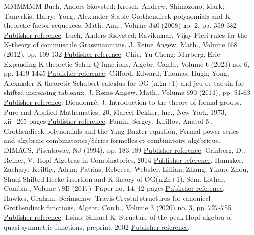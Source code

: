 \begin{thebibliography}{MMMMMM}
 Buch, Anders Skovsted; Kresch, Andrew; Shimozono, Mark; Tamvakis, Harry; Yong, Alexander Stable Grothendieck polynomials and K-theoretic factor sequences, Math. Ann., Volume 340 (2008) no. 2, pp. 359-382 \href{https://alco.centre-mersenne.org/articles/10.5802/alco.362/#BKSTY}{Publisher reference}.
 Buch, Anders Skovsted; Ravikumar, Vijay Pieri rules for the K-theory of cominuscule Grassmannians, J. Reine Angew. Math., Volume 668 (2012), pp. 109-132 \href{https://alco.centre-mersenne.org/articles/10.5802/alco.362/#BuchRavikumar}{Publisher reference}.
 Chiu, Yu-Cheng; Marberg, Eric Expanding K-theoretic Schur Q-functions, Algebr. Comb., Volume 6 (2023) no. 6, pp. 1419-1445 \href{https://alco.centre-mersenne.org/articles/10.5802/alco.362/#ChiuMarberg}{Publisher reference}.
 Clifford, Edward; Thomas, Hugh; Yong, Alexander K-theoretic Schubert calculus for  OG (n,2n+1) and jeu de taquin for shifted increasing tableaux, J. Reine Angew. Math., Volume 690 (2014), pp. 51-63 \href{https://alco.centre-mersenne.org/articles/10.5802/alco.362/#CTY}{Publisher reference}.
 Dieudonné, J. Introduction to the theory of formal groups, Pure and Applied Mathematics, 20, Marcel Dekker, Inc., New York, 1973, xii+265 pages \href{https://alco.centre-mersenne.org/articles/10.5802/alco.362/#Dieudonne}{Publisher reference}.
 Fomin, Sergey; Kirillov, Anatol N. Grothendieck polynomials and the Yang-Baxter equation, Formal power series and algebraic combinatorics/Séries formelles et combinatoire algébrique, DIMACS, Piscataway, NJ (1994), pp. 183-189 \href{https://alco.centre-mersenne.org/articles/10.5802/alco.362/#FominKirillov94}{Publisher reference}.
 Grinberg, D.; Reiner, V. Hopf Algebras in Combinatorics, 2014 \href{https://alco.centre-mersenne.org/articles/10.5802/alco.362/#GrinbergReiner}{Publisher reference}.
 Hamaker, Zachary; Keilthy, Adam; Patrias, Rebecca; Webster, Lillian; Zhang, Yinuo; Zhou, Shuqi Shifted Hecke insertion and K-theory of OG(n,2n+1), Sém. Lothar. Combin., Volume 78B (2017), Paper no. 14, 12 pages \href{https://alco.centre-mersenne.org/articles/10.5802/alco.362/#HKPWZZ}{Publisher reference}.
 Hawkes, Graham; Scrimshaw, Travis Crystal structures for canonical Grothendieck functions, Algebr. Comb., Volume 3 (2020) no. 3, pp. 727-755 \href{https://alco.centre-mersenne.org/articles/10.5802/alco.362/#HawScr}{Publisher reference}.
 Hsiao, Samuel K. Structure of the peak Hopf algebra of quasi-symmetric functions, preprint, 2002 \href{https://alco.centre-mersenne.org/articles/10.5802/alco.362/#Hsiao}{Publisher reference}.

\end{thebibliography}

